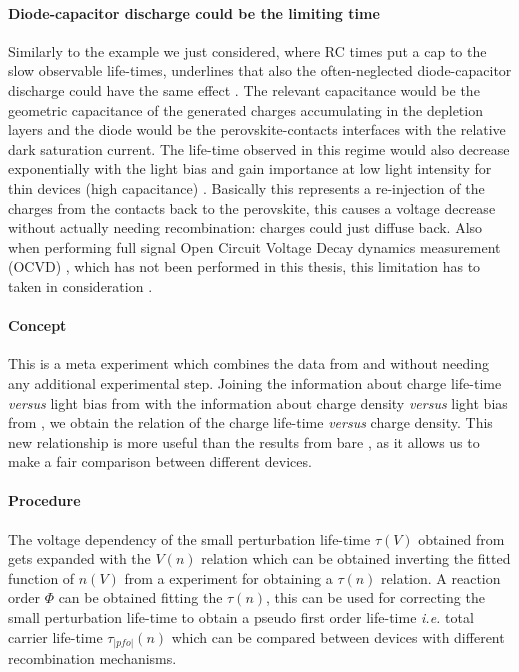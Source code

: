 \paragraph{Diode\hyp{}capacitor discharge could be the limiting time}
Similarly to the example we just considered, where RC times put a cap to the slow observable life\hyp{}times,  underlines that also the often-neglected diode\hyp{}capacitor discharge could have the same effect \cite{Tvingstedt2017,Hellen2003}.
The relevant capacitance would be the geometric capacitance of the generated charges accumulating in the depletion layers and the diode would be the perovskite-contacts interfaces with the relative dark saturation current.
The life\hyp{}time observed in this regime would also decrease exponentially with the light bias \cite{Castaner1981} and gain importance at low light intensity for thin devices (high capacitance) \cite{Kiermasch2018}.
Basically this represents a re\hyp{}injection of the charges from the contacts back to the perovskite, this causes a voltage decrease without actually needing recombination: charges could just diffuse back.
Also when performing full signal Open Circuit Voltage Decay dynamics measurement (OCVD) \cite{Lederhandler1955,Mahan1981}, which has not been performed in this thesis, this limitation has to taken in consideration \cite{Tvingstedt2017,Pockett2017,Pockett2015,Kiermasch2018}.

\FloatBarrier
\newpage
{}\label{tpvce}

\paragraph{Concept}
This is a meta experiment which combines the data from  and  without needing any additional experimental step.
Joining the information about charge life\hyp{}time \textsl{versus} light bias from  with the information about charge density \textsl{versus} light bias from , we obtain the relation of the charge life\hyp{}time \textsl{versus} charge density.
This new relationship is more useful than the results from bare , as it allows us to make a fair comparison between different devices.

\paragraph{Procedure}
The voltage dependency of the small perturbation life\hyp{}time $\tau(V)$ obtained from  gets expanded with the $V(n)$ relation which can be obtained inverting the fitted function of $n(V)$ from a  experiment for obtaining a $\tau(n)$ relation.
A reaction order $\Phi$ can be obtained fitting the $\tau(n)$, this can be used for correcting the small perturbation life\hyp{}time to obtain a pseudo first order life\hyp{}time \textsl{i.e.} total carrier life\hyp{}time $\tau_|pfo|(n)$ which can be compared between devices with different recombination mechanisms.

